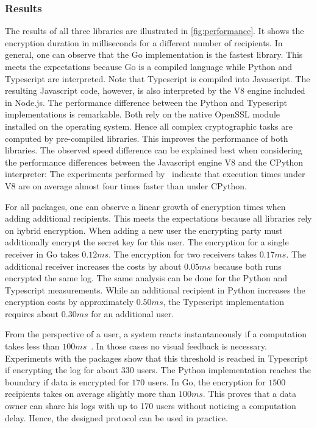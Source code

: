 \documentclass[../main.tex]{subfiles}
\begin{document}
\subsubsection{Results}
The results of all three libraries are illustrated in \cref{fig:performance}.
It shows the encryption duration in milliseconds for a different number of recipients.
In general, one can observe that the Go implementation is the fastest library.
This meets the expectations because Go is a compiled language while Python and Typescript are interpreted.
Note that Typescript is compiled into Javascript.
The resulting Javascript code, however, is also interpreted by the V8 engine included in Node.js.
The performance difference between the Python and Typescript implementations is remarkable.
Both rely on the native OpenSSL module installed on the operating system.
Hence all complex cryptographic tasks are computed by pre-compiled libraries.
This improves the performance of both libraries.
The observed speed difference can be explained best when considering the performance differences between the Javascript engine V8 and the CPython interpreter:
The experiments performed by~\cite{Lion2022} indicate that execution times under V8 are on average almost four times faster than under CPython.

For all packages, one can observe a linear growth of encryption times when adding additional recipients.
This meets the expectations because all libraries rely on hybrid encryption.
When adding a new user the encrypting party must additionally encrypt the secret key for this user.
The encryption for a single receiver in Go takes $0.12ms$.
The encryption for two receivers takes $0.17ms$.
The additional receiver increases the costs by about $0.05ms$ because both runs encrypted the same log.
The same analysis can be done for the Python and Typescript measurements.
While an additional recipient in Python increases the encryption costs by approximately $0.50ms$, the Typescript implementation requires about $0.30ms$ for an additional user.

From the perspective of a user, a system reacts instantaneously if a computation takes less than $100ms$~\cite{Nielson1993}.
In those cases no visual feedback is necessary.
Experiments with the packages show that this threshold is reached in Typescript if encrypting the log for about $330$ users.
The Python implementation reaches the boundary if data is encrypted for $170$ users.
In Go, the encryption for $1500$ recipients takes on average slightly more than $100ms$.
This proves that a data owner can share his logs with up to 170 users without noticing a computation delay.
Hence, the designed protocol can be used in practice.
\end{document}
